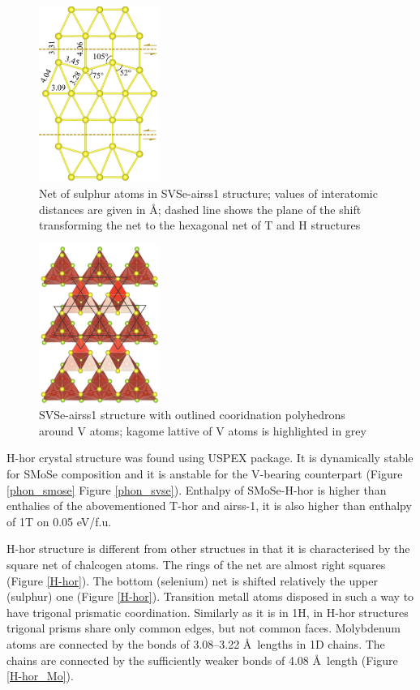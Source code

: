 \documentclass[a4paperm]{article}
\begin{document}
\begin{figure}
	\includegraphics[width=0.35\textwidth]{airss1v_s.png}
	\caption{Net of sulphur atoms in SVSe-airss1 structure; values of interatomic distances are given in \AA; dashed line shows the plane of the shift transforming the net to the hexagonal net of T and H structures}
\label{airss1_s}
\end{figure}


\begin{figure}[H]
        \includegraphics[width=0.35\textwidth]{airss1_v_poly.png}
        \caption{SVSe-airss1 structure with outlined cooridnation polyhedrons around V atoms; kagome lattive of V atoms is highlighted in grey}
\label{airss1_poly}
\end{figure}



H-hor crystal structure was found using USPEX package.
It is dynamically stable for SMoSe composition and it is anstable for the V-bearing counterpart (Figure \ref{phon_smose} Figure \ref{phon_svse}).
Enthalpy of SMoSe-H-hor is higher than enthalies of the abovementioned T-hor and airss-1, it is also higher than enthalpy of 1T on 0.05 eV/f.u.

H-hor structure is different from other structues in that it is characterised by the square net of chalcogen atoms.
The rings of the net are almost right squares (Figure \ref{H-hor}).
The bottom (selenium) net is shifted relatively the upper (sulphur) one (Figure \ref{H-hor}).
Transition metall atoms disposed in such a way to have trigonal prismatic coordination.
Similarly as it is in 1H, in H-hor structures trigonal prisms share only common edges, but not common faces.
Molybdenum atoms are connected by the bonds of 3.08--3.22 \AA\ lengths in 1D chains.
The chains are connected by the sufficiently weaker bonds of 4.08 \AA\ length (Figure \ref{H-hor_Mo}).
\end{document}

